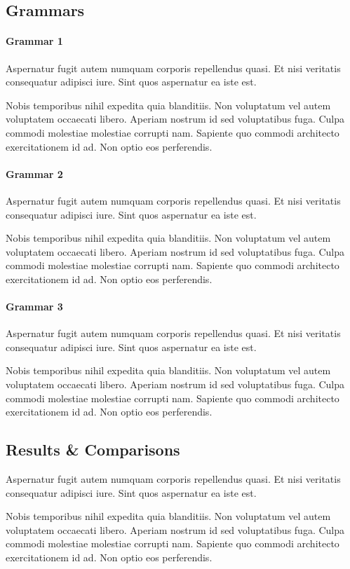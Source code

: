\documentclass[nonatbib,numbers,10pt]{sigplanconf}
\begin{document}
\subsection{Grammars}
\paragraph{Grammar 1}
Aspernatur fugit autem numquam corporis repellendus quasi. Et nisi veritatis consequatur adipisci iure. Sint quos aspernatur ea iste est.

Nobis temporibus nihil expedita quia blanditiis. Non voluptatum vel autem voluptatem occaecati libero. Aperiam nostrum id sed voluptatibus fuga. Culpa commodi molestiae molestiae corrupti nam. Sapiente quo commodi architecto exercitationem id ad. Non optio eos perferendis.
\paragraph{Grammar 2}
Aspernatur fugit autem numquam corporis repellendus quasi. Et nisi veritatis consequatur adipisci iure. Sint quos aspernatur ea iste est.

Nobis temporibus nihil expedita quia blanditiis. Non voluptatum vel autem voluptatem occaecati libero. Aperiam nostrum id sed voluptatibus fuga. Culpa commodi molestiae molestiae corrupti nam. Sapiente quo commodi architecto exercitationem id ad. Non optio eos perferendis.
\paragraph{Grammar 3}
Aspernatur fugit autem numquam corporis repellendus quasi. Et nisi veritatis consequatur adipisci iure. Sint quos aspernatur ea iste est.

Nobis temporibus nihil expedita quia blanditiis. Non voluptatum vel autem voluptatem occaecati libero. Aperiam nostrum id sed voluptatibus fuga. Culpa commodi molestiae molestiae corrupti nam. Sapiente quo commodi architecto exercitationem id ad. Non optio eos perferendis.
\subsection{Results \& Comparisons}
Aspernatur fugit autem numquam corporis repellendus quasi. Et nisi veritatis consequatur adipisci iure. Sint quos aspernatur ea iste est.

Nobis temporibus nihil expedita quia blanditiis. Non voluptatum vel autem voluptatem occaecati libero. Aperiam nostrum id sed voluptatibus fuga. Culpa commodi molestiae molestiae corrupti nam. Sapiente quo commodi architecto exercitationem id ad. Non optio eos perferendis.
\end{document}
